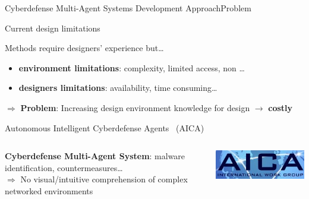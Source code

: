 \begin{frame}{Cyberdefense Multi-Agent Systems Development Approach}{Problem}

    \begin{alertblock}{Current design limitations}

        Methods require designers' experience but\dots
        \begin{itemize}
            \item \textbf{environment limitations}: complexity, limited access, non \dots
            \item \textbf{designers limitations}: availability, time consuming\dots
        \end{itemize}

        \vspace{-2ex}

        \begin{center}
            \begin{minipage}{11cm}
                \begin{block}{}
                    $\Longrightarrow$ \textbf{Problem}: Increasing design environment knowledge for design $\rightarrow$ \textbf{costly}
                \end{block}
            \end{minipage}
        \end{center}

        \vspace{-2ex}
        \begin{center}
            \begin{minipage}{0.95\linewidth}
                \centering
                \begin{exampleblock}{Autonomous Intelligent Cyberdefense Agents~\cite{Kott2023} (AICA)}

                    \begin{columns}
                        \hspace{5ex}
                        \begin{column}{0.85\textwidth}
                            \textbf{Cyberdefense Multi-Agent System}: malware identification, countermeasures\dots \\
                            $\Longrightarrow$ No visual/intuitive comprehension of complex networked environments
                        \end{column}
                        \begin{column}{0.22\textwidth}
                            \hspace{-2.5ex}
                            \includegraphics[width=0.8\linewidth]{figures/AICA_IWG.jpg}
                        \end{column}
                    \end{columns}


\end{exampleblock}
\end{minipage}
\end{center}
\end{alertblock}
\end{frame}
